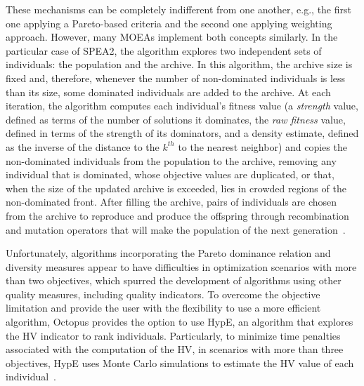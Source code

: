 These mechanisms can be completely indifferent from one another, e.g., the first one applying a Pareto-based criteria and the second one applying weighting approach. However, many \acp{MOEA} implement both concepts similarly. In the particular case of \ac{SPEA2}, the algorithm explores two independent sets of individuals: the population and the archive. In this algorithm, the archive size is fixed and, therefore, whenever the number of non-dominated individuals is less than its size, some dominated individuals are added to the archive. At each iteration, the algorithm computes each individual's fitness value (a \textit{strength} value, defined as terms of the number of solutions it dominates, the \textit{raw fitness} value, defined in terms of the strength of its dominators, and a density estimate, defined as the inverse of the distance to the $k^{th}$ to the nearest neighbor) and copies the non-dominated individuals from the population to the archive, removing any individual that is dominated, whose objective values are duplicated, or that, when the size of the updated archive is exceeded, lies in crowded regions of the non-dominated front. After filling the archive, pairs of individuals are chosen from the archive to reproduce and produce the offspring through recombination and mutation operators that will make the population of the next generation~\cite{Zitzler2001SPEA2}.

Unfortunately, algorithms incorporating the Pareto dominance relation and diversity measures appear to have difficulties in optimization scenarios with more than two objectives, which spurred the development of algorithms using other quality measures, including quality indicators. To overcome the objective limitation and provide the user with the flexibility to use a more efficient algorithm, Octopus provides the option to use \ac{HypE}, an algorithm that explores the \ac{HV} indicator to rank individuals. Particularly, to minimize time penalties associated with the computation of the \ac{HV}, in scenarios with more than three objectives, \ac{HypE} uses Monte Carlo simulations to estimate the \ac{HV} value of each individual~\cite{Zitzler2011HypE}. 



